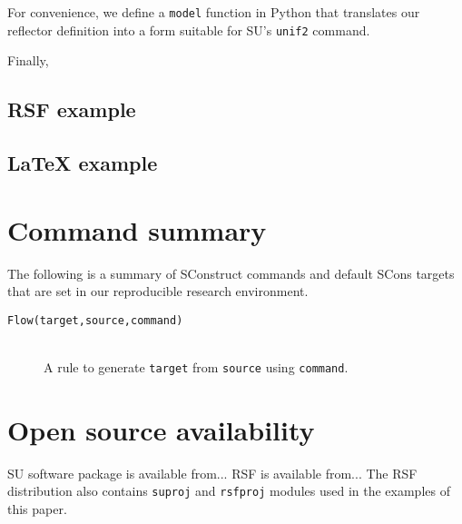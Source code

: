 For convenience, we define a \texttt{model} function in Python that
translates our reflector definition into a form suitable for SU's
\texttt{unif2} command. 



Finally, 

\label{flow}

\subsection{RSF example}

\subsection{LaTeX example}

\section{Command summary}

The following is a summary of SConstruct commands and default SCons
targets that are set in our reproducible research environment.

\begin{description}
\item[\texttt{Flow(target,source,command)}] \dotfill \pageref{flow} \\
A rule to generate \texttt{target} from \texttt{source} using \texttt{command}.
\end{description}

\section{Open source availability}

SU software package is available from... RSF is available from... The
RSF distribution also contains \texttt{suproj} and \texttt{rsfproj}
modules used in the examples of this paper.





